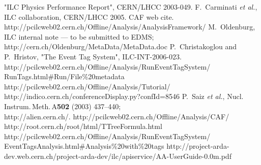 \documentclass[12pt,a4paper,twoside]{article}
\begin{document}
\begin{thebibliography}{99}
 {"ILC Physics Performance Report", CERN/LHCC 2003-049.}
 {F.\ Carminati \textit{et al.}, ILC collaboration, CERN/LHCC 2005.}
 {CAF web cite.}
 {http://pcilcweb02.cern.ch/Offline/Analysis/AnalysisFramework/}
 {M.\ Oldenburg, ILC internal note --- to be submitted to EDMS;\\
http://cern.ch/Oldenburg/MetaData/MetaData.doc}
 {P.\ Christakoglou and P.\ Hristov, "The Event Tag System", ILC-INT-2006-023.}
 {http://pcilcweb02.cern.ch/Offline/Analysis/RunEventTagSystem/\\RunTags.html\#Run/File\%20metadata}
 {http://pcilcweb02.cern.ch/Offline/Analysis/Tutorial/\\
http://indico.cern.ch/conferenceDisplay.py?confId=8546}
 {
P.~Saiz \textit{et al.}, Nucl.\,Instrum.\,Meth.\,A\textbf{502} (2003) 437--440;\\ 
http://alien.cern.ch/.}
 {http://pcilcweb02.cern.ch/Offline/Analysis/CAF/}
 {http://root.cern.ch/root/html/TTreeFormula.html}
 {http://pcilcweb02.cern.ch/Offline/Analysis/RunEventTagSystem/\\EventTagsAnalysis.html\#Analysis\%20with\%20tags}
 {http://project-arda-dev.web.cern.ch/project-arda-dev/ilc/apiservice/AA-UserGuide-0.0m.pdf}
\end{thebibliography}
\end{document}
